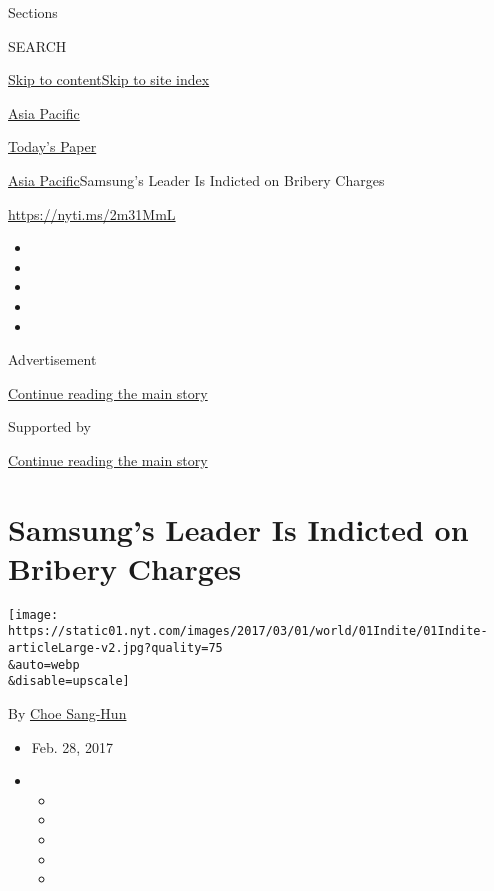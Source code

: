 Sections

SEARCH

\protect\hyperlink{site-content}{Skip to
content}\protect\hyperlink{site-index}{Skip to site index}

\href{https://www.nytimes.com/section/world/asia}{Asia Pacific}

\href{https://myaccount.nytimes.com/auth/login?response_type=cookie\&client_id=vi}{}

\href{https://www.nytimes.com/section/todayspaper}{Today's Paper}

\href{/section/world/asia}{Asia Pacific}\textbar{}Samsung's Leader Is
Indicted on Bribery Charges

\url{https://nyti.ms/2m31MmL}

\begin{itemize}
\item
\item
\item
\item
\item
\end{itemize}

Advertisement

\protect\hyperlink{after-top}{Continue reading the main story}

Supported by

\protect\hyperlink{after-sponsor}{Continue reading the main story}

\hypertarget{samsungs-leader-is-indicted-on-bribery-charges}{%
\section{Samsung's Leader Is Indicted on Bribery
Charges}\label{samsungs-leader-is-indicted-on-bribery-charges}}

\texttt{[image: https://static01.nyt.com/images/2017/03/01/world/01Indite/01Indite-articleLarge-v2.jpg?quality=75\\\&auto=webp\\\&disable=upscale]}

By \href{http://www.nytimes.com/by/choe-sang-hun}{Choe Sang-Hun}

\begin{itemize}
\item
  Feb. 28, 2017
\item
  \begin{itemize}
  \item
  \item
  \item
  \item
  \item
  \end{itemize}
\end{itemize}

